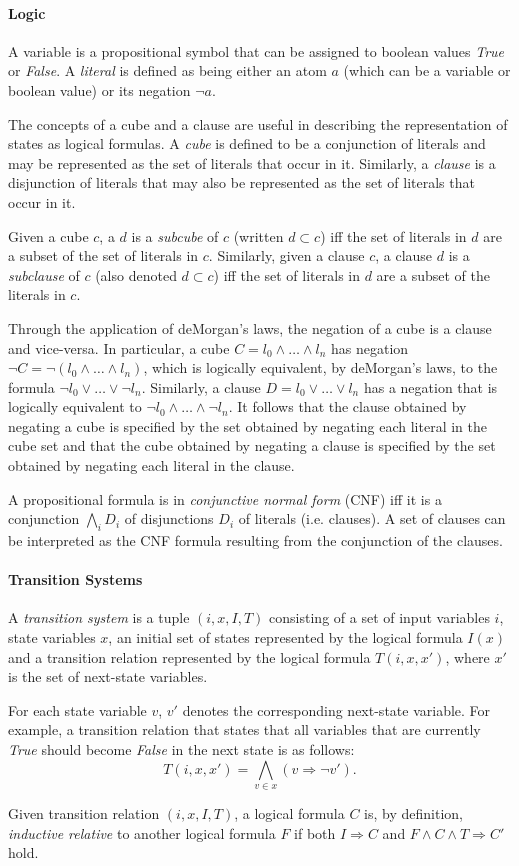 \documentclass[12pt,a4paper,twoside,openright]{report}
\begin{document}
\paragraph{Logic}{
A variable is a propositional symbol that can be assigned to boolean values {\it True}
or {\it False}. A \emph{literal} is defined as being either an atom $a$ (which can
be a variable or boolean value) or its negation $\neg a$.

The concepts of a cube and a clause are useful in describing the
representation of states as logical formulas.
A \emph{cube} is defined to be a conjunction of literals and may be represented as the set
of literals that occur in it. Similarly, a \emph{clause} is a disjunction of literals that
may also be represented as the set of literals that occur in it.

Given a cube $c$, a $d$ is a \emph{subcube} of $c$ (written $d \subset c$)
iff the set of literals in $d$ are a subset of the set of literals in $c$.
Similarly, given a clause $c$, a clause $d$ is a \emph{subclause} of $c$ (also
denoted $d \subset c$) iff the set of literals in $d$ are a subset of
the literals in $c$.

Through the application of deMorgan's laws, the negation of a cube is a clause and
vice-versa. In particular, a cube $C = l_0 \wedge \ldots \wedge l_n$ has negation
$\neg C = \neg (l_0 \wedge \ldots \wedge l_n)$, which is logically equivalent,
by deMorgan's laws, to the formula $\neg l_0 \vee \ldots \vee \neg l_n$.
Similarly, a clause $D = l_0 \vee \ldots \vee l_n$ has a negation that is
logically equivalent to $\neg l_0 \wedge \ldots \wedge \neg l_n$. It follows
that the clause obtained by negating a cube is specified by the set obtained
by negating each literal in the cube set and that the cube obtained by negating
a clause is specified by the set obtained by negating each literal in the clause.

A propositional formula is in \emph{conjunctive normal form} (CNF) iff it is a conjunction 
$\bigwedge_i D_i$ of disjunctions $D_i$ of literals (i.e. clauses). A set of clauses
can be interpreted as the CNF formula resulting from the conjunction
of the clauses.}

\paragraph{Transition Systems}{
A \emph{transition system} is a tuple $(i,x,I,T)$ consisting of a set of input
variables $i$, state variables $x$, an initial
set of states represented by the logical formula $I(x)$ and
a transition relation represented by the logical formula $T(i,x,x')$,
where $x'$ is the set of next-state variables.

For each state variable $v$, $v'$ denotes the corresponding next-state variable.
For example, a transition relation that states that all variables that are
currently {\it True} should become {\it False} in the next state is as follows:
$$T(i,x,x') = \bigwedge_{v \in x} (v \Rightarrow \neg v').$$

Given transition relation $(i,x,I,T)$, a logical formula $C$ is, by definition,
\emph{inductive relative} to another logical formula $F$ if both
$I \Rightarrow C$ and $F \wedge C \wedge T \Rightarrow C'$ hold.
}
\end{document}

